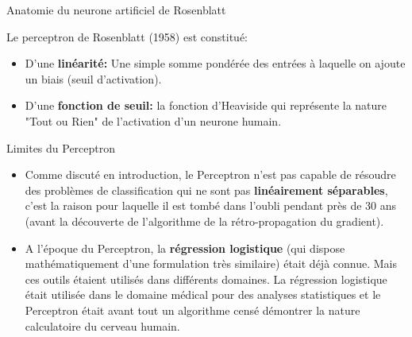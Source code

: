\begin{frame}{Anatomie du neurone artificiel de Rosenblatt}
\begin{center}
	\end{center}
	
	Le perceptron de Rosenblatt (1958) est constitué:
	
	\begin{itemize}
		\item D'une \textbf{linéarité:} Une simple somme pondérée des entrées à laquelle on ajoute un biais (seuil d'activation).
		\item D'une \textbf{fonction de seuil:} la fonction d'Heaviside qui représente la nature "Tout ou Rien" de l'activation d'un neurone humain. 
	\end{itemize}
\end{frame}

\begin{frame}{Limites du Perceptron}
	\begin{itemize}
		\item Comme discuté en introduction, le Perceptron n'est pas capable de résoudre des problèmes de classification qui ne sont pas \textbf{linéairement séparables}, c'est la raison pour laquelle il est tombé dans l'oubli pendant près de 30 ans (avant la découverte de l'algorithme de la rétro-propagation du gradient).
		\item A l'époque du Perceptron, la \textbf{régression logistique} (qui dispose mathématiquement d'une formulation très similaire) était déjà connue. Mais ces outils étaient utilisés dans différents domaines. La régression logistique était utilisée dans le domaine médical pour des analyses statistiques et le Perceptron était avant tout un algorithme censé démontrer la nature calculatoire du cerveau humain.
	\end{itemize}
	
\end{frame}
